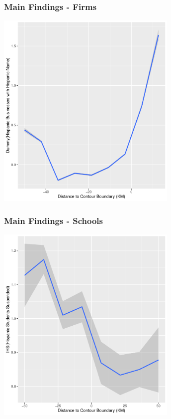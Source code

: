 \documentclass{beamer}
\begin{document}
\begin{frame}
\frametitle{Main Findings - Firms}

\centering
        \includegraphics[width=0.65\textwidth]{../../analysis/Output/graphs/hispanicbusnname.pdf}\\
\end{frame}

\begin{frame}
\frametitle{Main Findings - Schools}
\centering
        \includegraphics[width=0.65\textwidth]{../../analysis/Output/graphs/hispanicsuspensions.pdf}\\
\end{frame}
\end{document}
